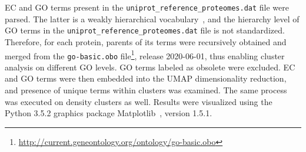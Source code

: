 EC and GO terms present in the \texttt{uniprot\_reference\_proteomes.dat} file were
parsed.
The latter is a weakly hierarchical vocabulary~\cite{ashburner2000gene}, and the hierarchy
level of GO terms in the \texttt{uniprot\_reference\_proteomes.dat} file is not
standardized.
Therefore, for each protein, parents of its terms were recursively obtained and merged
from the \texttt{go-basic.obo}
file\footnote{\url{http://current.geneontology.org/ontology/go-basic.obo}}, release
2020-06-01, thus enabling cluster analysis on different GO levels.
GO terms labeled as obsolete were excluded.
EC and GO terms were then embedded into the UMAP dimensionality reduction, and presence
of unique terms within clusters was examined.
The same process was executed on density clusters as well.
Results were visualized using the Python 3.5.2 graphics package
Matplotlib~\cite{hunter2007matplotlib}, version 1.5.1.
